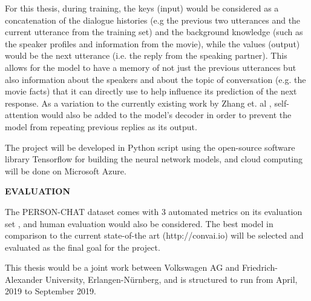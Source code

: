 \documentclass[paper=a4,11pt,parskip=half,toc=listof]{scrartcl}
\begin{document}
	For this thesis, during training, the keys (input) would be considered as a concatenation of the dialogue histories (e.g the previous two utterances and the current utterance from the training set) and the background knowledge (such as the speaker profiles and information from the movie), while the values (output) would be the next utterance (i.e. the reply from the speaking partner). This allows for the model to have a memory of not just the previous utterances but also information about the speakers and about the topic of conversation (e.g. the movie facts) that it can directly use to help influence its prediction of the next response. As a variation to the currently existing work by Zhang et. al \cite{zhang2018personalizing}, self-attention would also be added to the model's decoder \cite{vaswani2017attention, shao2017generating} in order to prevent the model from repeating previous replies as its output.
	
	
	
	The project will be developed in Python script using the open-source software library Tensorflow for building the neural network	models, and cloud computing will be done on Microsoft Azure.  
	
	\textbf{EVALUATION}
	
	The PERSON-CHAT dataset comes with 3 automated metrics on its evaluation set \cite{zhang2018personalizing}, and human evaluation would also be considered. The best model in comparison to the current state-of-the art (http://convai.io) will be selected and evaluated as the final goal for the project.
	
	This thesis would be a joint work between Volkswagen AG and Friedrich-Alexander University, Erlangen-Nürnberg, and is structured to run from April, 2019 to September 2019. 
		
	
	
\end{document}
